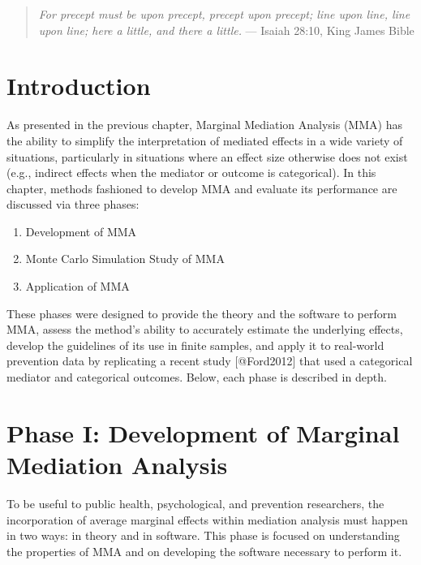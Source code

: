 \documentclass[]{article}
\title{}
\author{}
\date{}
\providecommand{\tightlist}{%
  \setlength{\itemsep}{0pt}\setlength{\parskip}{0pt}}
\begin{document}
\begin{quote}
\emph{For precept must be upon precept, precept upon precept; line upon line, line upon line; here a little, and there a little.}
--- Isaiah 28:10, King James Bible
\end{quote}

\doublespacing

\section{Introduction}\label{introduction}

As presented in the previous chapter, Marginal Mediation Analysis (MMA)
has the ability to simplify the interpretation of mediated effects in a
wide variety of situations, particularly in situations where an effect
size otherwise does not exist (e.g., indirect effects when the mediator
or outcome is categorical). In this chapter, methods fashioned to
develop MMA and evaluate its performance are discussed via three phases:

\begin{enumerate}
\def\labelenumi{\arabic{enumi}.}
\tightlist
\item
  Development of MMA
\item
  Monte Carlo Simulation Study of MMA
\item
  Application of MMA
\end{enumerate}

\noindent These phases were designed to provide the theory and the
software to perform MMA, assess the method's ability to accurately
estimate the underlying effects, develop the guidelines of its use in
finite samples, and apply it to real-world prevention data by
replicating a recent study {[}@Ford2012{]} that used a categorical
mediator and categorical outcomes. Below, each phase is described in
depth.

\section{Phase I: Development of Marginal Mediation
Analysis}\label{phase-i-development-of-marginal-mediation-analysis}

To be useful to public health, psychological, and prevention
researchers, the incorporation of average marginal effects within
mediation analysis must happen in two ways: in theory and in software.
This phase is focused on understanding the properties of MMA and on
developing the software necessary to perform it.
\end{document}
